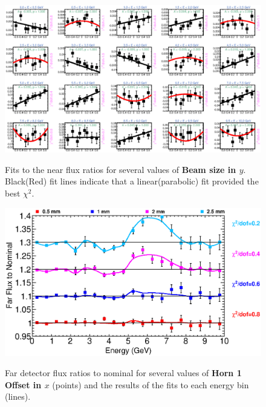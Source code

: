 {\begin{figure}[ht]
  \begin{center}
    {\includegraphics[width=5.0in]{figures/BeamSigmaY_near_fits.eps}}
  \end{center}
\caption{ Fits to the near flux ratios for several values of {\bf Beam size in $y$}. Black(Red) fit lines indicate that a linear(parabolic) fit provided the best $\chi^2$. }
\end{figure}

\clearpage

\begin{figure}[ht]
  \begin{center}
    {\includegraphics[width=6.0in]{figures/Horn1XOffset_far_summary.eps}}
  \end{center}
\caption{ Far detector flux ratios to nominal for several values of {\bf Horn 1 Offset in $x$} (points) and the results of the fits to each energy bin (lines).}
\end{figure}

}
